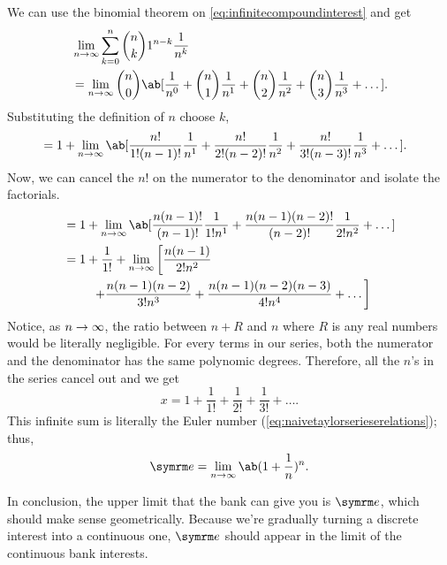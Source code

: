 We can use the binomial theorem on \cref{eq:infinitecompoundinterest} and get
\begin{align*}
   & \lim_{n \appr \infty}\sum_{k = 0}^{n}{n \choose k}1^{n - k}\frac{1}{n^k}                                                                                 \\
   & = \lim_{n \appr \infty}{n \choose 0} \ab[\frac{1}{n^0} + {n \choose 1}\frac{1}{n^1} + {n \choose 2}\frac{1}{n^2} + {n \choose 3}\frac{1}{n^3} + \dots].
\end{align*}
Substituting the definition of $n$ choose $k$,
\begin{align*}
   & = 1 + \lim_{n \appr \infty} \ab[ \frac{n!}{1!(n - 1)!}\frac{1}{n^1} + \frac{n!}{2!(n - 2)!}\frac{1}{n^2} + \frac{n!}{3!(n - 3)!}\frac{1}{n^3} + \dots ].
\end{align*}
Now, we can cancel the $n!$ on the numerator to the denominator and isolate the factorials.
\begin{align*}
   & = 1 + \lim_{n \appr \infty}\ab[\frac{n(n - 1)!}{(n - 1)!}\frac{1}{1!n^1} + \frac{n(n - 1)(n - 2)!}{(n - 2)!}\frac{1}{2!n^2} + \dots] \\
   & = \begin{multlined}[t]
         1 + \frac{1}{1!} + \lim_{n \appr \infty} \left[ \frac{n(n - 1)}{2!n^2} \right. \\
           \left. + \frac{n(n - 1)(n - 2)}{3!n^3} + \frac{n(n - 1)(n - 2)(n - 3)}{4!n^4} + \dots \right]
       \end{multlined}
\end{align*}
Notice, as $n \rightarrow \infty$, the ratio between $n + R$ and $n$ where $R$ is any real numbers would be literally negligible. For every terms in our series, both the numerator and the denominator has the same polynomic degrees. Therefore, all the $n$'s in the series cancel out and we get
\begin{equation}
  x = 1 + \frac{1}{1!} + \frac{1}{2!} + \frac{1}{3!} + \dots.
\end{equation}
This infinite sum is literally the Euler number (\cref{eq:naivetaylorserieserelations}); thus, 
\begin{equation}
  \e = \lim_{n \appr \infty}\ab(1 + \frac{1}{n})^n. \label{eq:e-def-infinite-interests}
\end{equation}

In conclusion, the upper limit that the bank can give you is $\e$, which should make sense geometrically. Because we're gradually turning a discrete interest into a continuous one, $\e$ should appear in the limit of the continuous bank interests.

